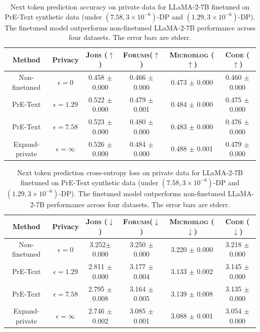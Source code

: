 \begin{table}[t]
    \centering
    \caption{Next token prediction accuracy on private data for LLaMA-2-7B finetuned on PrE-Text synthetic data (under $(7.58, 3 \times 10^{-6})$-DP and $(1.29, 3 \times 10^{-6})$-DP). The finetuned model outperforms non-finetuned LLaMA-2-7B  performance across four datasets. The error bars are stderr.}
    \begin{tabular}{c | c || c | c | c | c}
      \toprule
      Method & Privacy &  \textsc{Jobs} ($\uparrow$)  & \textsc{Forums}($\uparrow$)  & \textsc{Microblog} ($\uparrow$) & \textsc{Code} ($\uparrow$) \\
      \midrule
      Non-finetuned & $\epsilon=0$ & 0.458 $\pm$ 0.000 & 0.466 $\pm$ 0.000 & 0.473 $\pm$ 0.000 & 0.460 $\pm$ 0.000 \\
      PrE-Text  & $\epsilon=1.29$ & 0.522 $\pm$ 0.000 & 0.479 $\pm$ 0.001  & 
       0.484 $\pm$ 0.000 &  0.475 $\pm$ 0.000  \\
      PrE-Text  & $\epsilon=7.58$ & 0.523 $\pm$ 0.000  & 
      0.480 $\pm$ 0.000 & 0.483 $\pm$ 0.000 & 0.476 $\pm$ 0.000   \\
      Expand-private & $\epsilon=\infty$ & 0.526 $\pm$ 0.000 & 0.484 $\pm$ 0.000 & 0.488 $\pm$ 0.001 & 0.479 $\pm$ 0.000 \\
    \bottomrule
    \end{tabular}
    \label{tab:zeroshot accuracy}
  \end{table}

\begin{table}[t]
    \centering
    \caption{
    Next token prediction cross-entropy loss on private data for LLaMA-2-7B finetuned on PrE-Text synthetic data (under $(7.58, 3 \times 10^{-6})$-DP and $(1.29, 3 \times 10^{-6})$-DP). The finetuned model outperforms non-finetuned LLaMA-2-7B  performance across four datasets. The error bars are stderr.}
    \begin{tabular}{c | c || c | c | c | c}
      \toprule
      Method & Privacy &  \textsc{Jobs} ($\downarrow$)  & \textsc{Forums}($\downarrow$)  & \textsc{Microblog} ($\downarrow$) & \textsc{Code} ($\downarrow$) \\
      \midrule
      Non-finetuned & $\epsilon=0$ & 3.252$\pm$ 0.000 & 3.250 $\pm$ 0.000 & 3.220 $\pm$ 0.000 & 3.218 $\pm$ 0.000 \\
      PrE-Text  & $\epsilon=1.29$ & 2.811 $\pm$ 0.000 & 3.177 $\pm$ 0.004  & 
       3.133 $\pm$ 0.002 &  3.145 $\pm$ 0.000  \\
      PrE-Text  & $\epsilon=7.58$ & 2.795 $\pm$ 0.008  & 
      3.164 $\pm$ 0.005 & 3.139 $\pm$ 0.008 & 3.135 $\pm$ 0.000   \\
      Expand-private & $\epsilon=\infty$ & 2.746 $\pm$ 0.002 & 3.085 $\pm$ 0.001 & 3.088 $\pm$ 0.001 & 3.054 $\pm$ 0.000 \\
    \bottomrule
    \end{tabular}
    \label{tab:zeroshot}
  \end{table}






